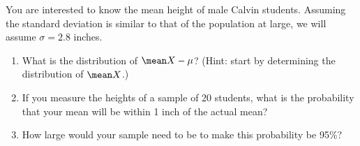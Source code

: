 \documentclass[twoside]{book}\usepackage[]{graphicx}\usepackage[]{xcolor}
\begin{document}
\begin{problem}
	You are interested to know the mean height of male Calvin students.
	Assuming the standard deviation is similar to that of the population
	at large, we will assume $\sigma = 2.8$ inches.

	\begin{enumerate}
		\item
			What is the distribution of $\mean X - \mu$?
			(Hint: start by determining the distribution of $\mean X$.)

		\item If you measure the heights of a sample of 20 students,
			what is the probability that your mean will be within 
			1 inch of the actual mean?
			
		\item
			How large would your sample need to be to make this probability
			be 95\%?
	\end{enumerate}
\end{problem}
\end{document}

